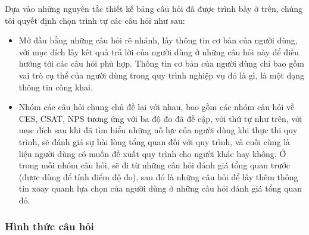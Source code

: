 \par
Dựa vào những nguyên tắc thiết kế bảng câu hỏi đã được trình bày ở trên, chúng tôi quyết định chọn trình tự các câu hỏi như sau:
\begin{itemize}
    \item Mở đầu bằng những câu hỏi rẽ nhánh, lấy thông tin cơ bản của người dùng, với mục đích lấy kết quả trả lời của người dùng ở những câu hỏi này để điều hướng tới các câu hỏi phù hợp. Thông tin cơ bản của người dùng chỉ bao gồm vai trò cụ thể của người dùng trong quy trình nghiệp vụ đó là gì, là một dạng thông tin công khai.
    \item Nhóm các câu hỏi chung chủ đề lại với nhau, bao gồm các nhóm câu hỏi về CES, CSAT, NPS tương ứng với ba độ đo đã đề cập, với thứ tự như trên, với mục đích sau khi đã tìm hiểu những nỗ lực của người dùng khi thực thi quy trình, sẽ đánh giá sự hài lòng tổng quan đối với quy trình, và cuối cùng là liệu người dùng có muốn đề xuất quy trình cho người khác hay không. Ở trong mỗi nhóm câu hỏi, sẽ đi từ những câu hỏi đánh giá tổng quan trước (được dùng để tính điểm độ đo), sau đó là những câu hỏi để lấy thêm thông tin xoay quanh lựa chọn của người dùng ở những câu hỏi đánh giá tổng quan đó.
\end{itemize}
\subsubsection{Hình thức câu hỏi}

